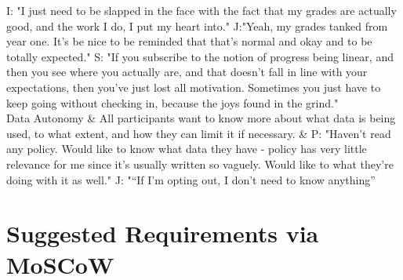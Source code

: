 \documentclass{l4proj}
\begin{document}
\begin{longtable}
  I: "I just need to be slapped in the face with the fact that my grades are actually good, and the work I do, I put my heart into." \newline
  J:"Yeah, my grades tanked from year one. It's be nice to be reminded that that's normal and okay and to be totally expected." \newline
  S: "If you subscribe to the notion of progress being linear, and then you see where you actually are, and that doesn’t fall in line with your expectations, then you’ve just lost all motivation. Sometimes you just have to keep going without checking in, because the joys found in the grind." \newline\\
Data Autonomy &
  All participants want to know more about what data is being used, to what extent, and how they can limit it if necessary. &
  P: "Haven’t read any policy. Would like to know what data they have - policy has very little relevance for me since it’s usually written so vaguely. Would like to what they’re doing with it as well." \newline
  J: "“If I’m opting out, I don’t need to know anything” \newline\\ \bottomrule
\end{longtable}


\section{Suggested Requirements via MoSCoW}
\end{document}
